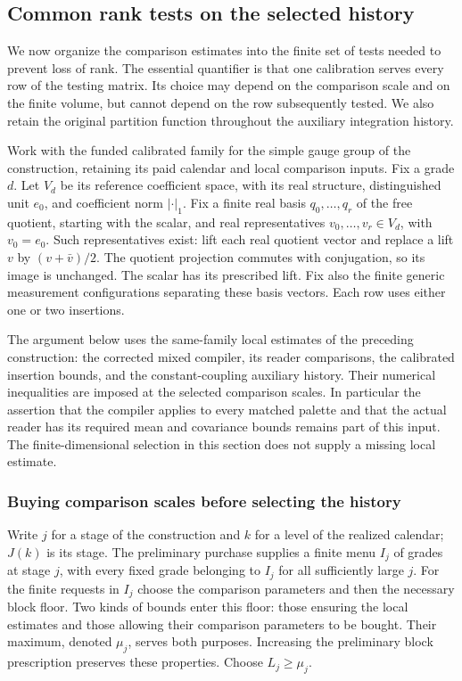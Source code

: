 \subsection{Common rank tests on the selected history}
\label{sec:actual-rank-purchases}

We now organize the comparison estimates into the finite set of tests
needed to prevent loss of rank. The essential quantifier is that one
calibration serves every row of the testing matrix. Its choice may depend
on the comparison scale and on the finite volume, but cannot depend on
the row subsequently tested. We also retain the original partition
function throughout the auxiliary integration history.

Work with the funded calibrated family for the simple gauge group of the
construction, retaining its paid calendar and local comparison inputs.
Fix a grade $d$. Let $V_d$ be its reference coefficient space, with its
real structure, distinguished unit $e_0$, and coefficient norm $|\cdot|_1$.
Fix a finite real basis $q_0,\ldots,q_r$ of the free quotient, starting
with the scalar, and real representatives $v_0,\ldots,v_r\in V_d$,
with $v_0=e_0$. Such representatives exist: lift each real quotient vector
and replace a lift $v$ by $(v+\bar v)/2$. The quotient projection commutes
with conjugation, so its image is unchanged. The scalar has its prescribed
lift. Fix also the finite generic measurement configurations separating
these basis vectors. Each row uses either one or two insertions.

The argument below uses the same-family local estimates of the preceding
construction: the corrected mixed compiler, its reader comparisons, the
calibrated insertion bounds, and the constant-coupling auxiliary history.
Their numerical inequalities are imposed at the selected comparison
scales. In particular the assertion that the compiler applies to every
matched palette and that the actual reader has its required mean and
covariance bounds remains part of this input. The finite-dimensional
selection in this section does not supply a missing local estimate.

\subsubsection{Buying comparison scales before selecting the history}

Write $j$ for a stage of the construction and $k$ for a level of the
realized calendar; $J(k)$ is its stage. The preliminary purchase supplies
a finite menu $I_j$ of grades at stage $j$, with every fixed grade belonging
to $I_j$ for all sufficiently large $j$. For the finite requests in $I_j$
choose the comparison parameters and then the necessary block floor.
Two kinds of bounds enter this floor: those ensuring the local estimates
and those allowing their comparison parameters to be bought. Their
maximum, denoted $\mu_j$, serves both purposes. Increasing the preliminary
block prescription preserves these properties. Choose $L_j\ge\mu_j$.

